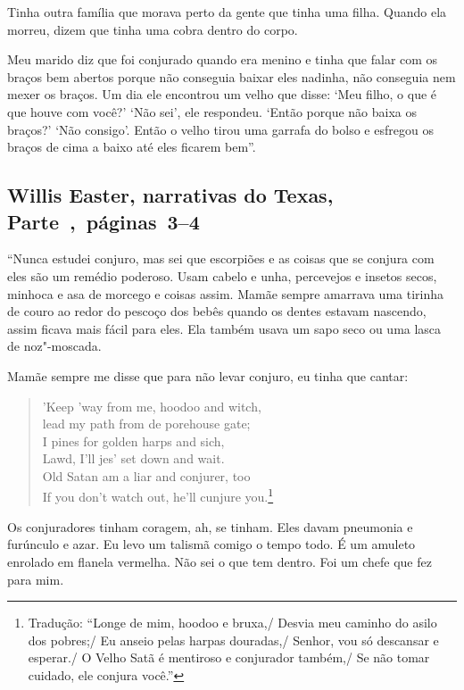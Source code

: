 Tinha outra família que morava perto da gente que tinha uma filha.
Quando ela morreu, dizem que tinha uma cobra dentro do corpo.

Meu marido diz que foi conjurado quando era menino e tinha que falar com
os braços bem abertos porque não conseguia baixar eles nadinha, não
conseguia nem mexer os braços. Um dia ele encontrou um velho que disse:
`Meu filho, o que é que houve com você?' `Não sei', ele respondeu.
`Então porque não baixa os braços?' `Não consigo'. Então o velho tirou
uma garrafa do bolso e esfregou os braços de cima a baixo até eles
ficarem bem''.

\subsection{Willis Easter, narrativas do Texas, Parte~,~páginas~3--4} \label{ref79}

``Nunca estudei conjuro, mas sei que escorpiões e as coisas que se
conjura com eles são um remédio poderoso. Usam cabelo e unha, percevejos
e insetos secos, minhoca e asa de morcego e coisas assim. Mamãe sempre
amarrava uma tirinha de couro ao redor do pescoço dos bebês quando os
dentes estavam nascendo, assim ficava mais fácil para eles. Ela também
usava um sapo seco ou uma lasca de noz"-moscada.

Mamãe sempre me disse que para não levar conjuro, eu tinha que cantar:

\begin{verse}
'Keep 'way from me, hoodoo and witch,\\
lead my path from de porehouse gate;\\
I pines for golden harps and sich,\\ 
Lawd, I'll jes' set down and wait.\\
Old Satan am a liar and conjurer, too\\
If you don't watch out, he'll cunjure you.\footnote{Tradução: ``Longe de mim, hoodoo e bruxa,/ Desvia meu caminho do asilo dos pobres;/ Eu anseio pelas harpas douradas,/ Senhor, vou só descansar e esperar./ O Velho Satã é mentiroso e conjurador também,/ Se não tomar cuidado, ele
conjura você.''}
\end{verse}

Os conjuradores tinham coragem, ah, se tinham. Eles davam pneumonia e
furúnculo e azar. Eu levo um talismã comigo o tempo todo. É um amuleto
enrolado em flanela vermelha. Não sei o que tem dentro. Foi um chefe que
fez para mim.

